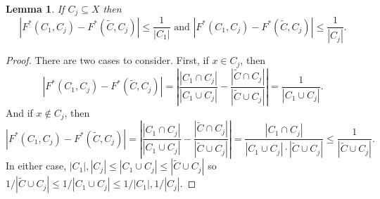 \documentclass[11pt]{article}
\newtheorem{lem}[thm]{Lemma}
\theoremstyle{remark}
\begin{document}
\begin{lem}\label{lem:one}
    If $C_j \subseteq X$ then
    \begin{equation*}
        \left|F^*(C_1, C_j) - F^*(\tilde{C}, C_j)\right| \leq \frac{1}{|C_1|} \text{ and } \left|F^*(C_1, C_j) - F^*(\tilde{C}, C_j)\right| \leq \frac{1}{|C_j|}.
    \end{equation*}
\end{lem}
\begin{proof}
    There are two cases to consider. First, if $x \in C_j$, then
    \begin{equation*}
        \left|F^*(C_1, C_j) - F^*(\tilde{C}, C_j)\right| = \left| \frac{|C_1 \cap C_j|}{|C_1 \cup C_j|} - \frac{|\tilde{C} \cap C_j|}{|\tilde{C} \cup C_j|} \right| = \frac{1}{|C_1 \cup C_j|}.
    \end{equation*}
    And if $x \not \in C_j$, then
    \begin{equation*}
        \left|F^*(C_1, C_j) - F^*(\tilde{C}, C_j)\right| = \left| \frac{|C_1 \cap C_j|}{|C_1 \cup C_j|} - \frac{|\tilde{C}  \cap C_j|}{|\tilde{C} \cup C_j|} \right| = \frac{|C_1 \cap C_j|}{|C_1 \cup C_j| \cdot |\tilde{C} \cup C_j|} \leq \frac{1}{|\tilde{C} \cup C_j|}.
    \end{equation*}
    In either case, $|C_1|, |C_j| \leq |C_1 \cup C_j| \leq |\tilde{C} \cup C_j|$ so $1 / |\tilde{C} \cup C_j| \leq 1 / |C_1 \cup C_j| \leq 1/ |C_1|, 1 / |C_j|$. 
\end{proof}
\end{document}
